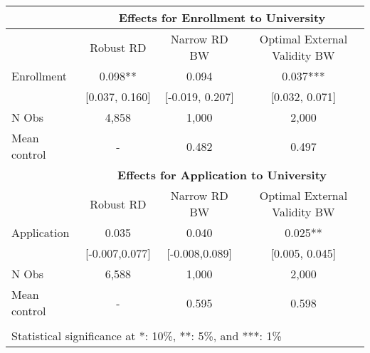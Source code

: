 \begin{tabular}{lccc}
 & \multicolumn{3}{c}{\textbf{Effects for Enrollment to University}} \\
\hline
                     & Robust RD & Narrow RD BW      & Optimal External Validity BW\\ \hline
Enrollment  & 0.098** & 0.094              & 0.037***                    \\
                      & [0.037, 0.160] & [-0.019, 0.207] & [0.032, 0.071]      \\ \addlinespace
 N Obs & 4,858 & 1,000 & 2,000 \\
 Mean control & - & 0.482 & 0.497 \\ \hline
\addlinespace
\addlinespace
\addlinespace
 & \multicolumn{3}{c}{\textbf{Effects for Application to University}} \\
                      & Robust RD & Narrow RD BW      & Optimal External Validity BW\\ \hline
Application & 0.035 & 0.040            & 0.025**                    \\
                 & [-0.007,0.077]     & [-0.008,0.089]  & [0.005, 0.045] \\ \addlinespace
                       N Obs & 6,588 & 1,000 & 2,000 \\
 Mean control & - &  0.595 & 0.598 \\ \hline
 \addlinespace
                      \multicolumn{4}{l}{\tiny{95\% CI in brackets.}} \\
                      \multicolumn{4}{l}{\tiny{Statistical significance at *: 10\%, **: 5\%, and ***: 1\%}} \\

\end{tabular}